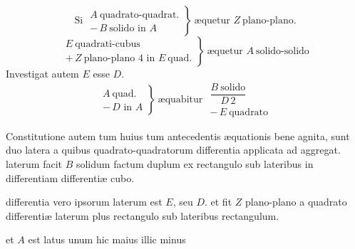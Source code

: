 \documentclass[11pt,a4paper]{article}
\begin{document}
\[ \text{Si } \left.\begin{array}{l} A\ \text{quadrato-quadrat.} \\ -\,B\ \text{solido in } A \end{array}\right\}\ \text{æquetur } Z\ \text{plano-plano.} \]
\[ \left.\begin{array}{l} E\ \text{quadrati-cubus} \\ +\,Z\ \text{plano-plano } 4 \text{ in } E\ \text{quad.} \end{array}\right\}\ \text{æquetur } A\ \text{solido-solido} \]
Investigat autem $E$ esse $D$.
\[ \left.\begin{array}{l} A\ \text{quad.} \\ -\,D \text{ in } A \end{array}\right\}\ \text{æquabitur } \begin{array}{l} \dfrac{B\ \text{solido}}{D\,2} \\ -\,E\ \text{quadrato} \end{array} \]

\marginal{$*$}
Constitutione autem tum huius tum antecedentis æquationis bene agnita, sunt duo latera a quibus quadrato-quadratorum differentia applicata ad aggregat. laterum facit $B$ solidum 
factum duplum ex rectangulo sub lateribus in differentiam  differentiæ cubo.

differentia vero ipsorum laterum est $E$, seu $D$. et fit $Z$ plano-plano a quadrato differentiæ laterum plus rectangulo sub lateribus  rectangulum.

et $A$ est latus unum hic maius illic minus
\end{document}
